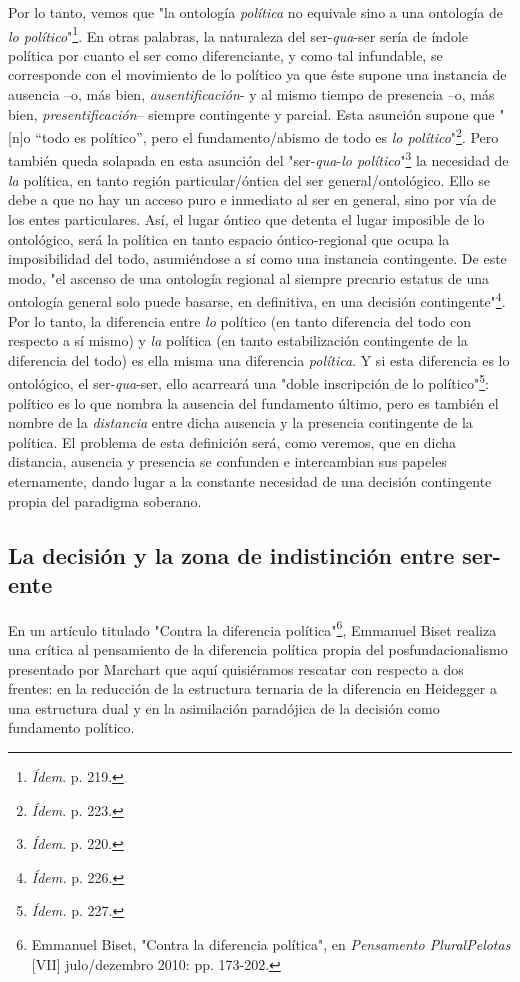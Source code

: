 \documentclass{book}
\begin{document}
Por lo tanto, vemos que "la ontología \emph{política} no equivale sino a
una ontología de \emph{lo político}"\footnote{\emph{Ídem}. p. 219.}. En
otras palabras, la naturaleza del ser-\emph{qua}-ser sería de índole
política por cuanto el ser como diferenciante, y como tal infundable, se
corresponde con el movimiento de lo político ya que éste supone una
instancia de ausencia --o, más bien, \emph{ausentificación}- y al mismo
tiempo de presencia --o, más bien, \emph{presentificación}-- siempre
contingente y parcial. Esta asunción supone que "{[}n{]}o ``todo es
político'', pero el fundamento/abismo de todo es \emph{lo
político}"\footnote{\emph{Ídem}. p. 223.}. Pero también queda solapada
en esta asunción del "ser-\emph{qua}-\emph{lo político}"\footnote{\emph{Ídem}.
  p. 220.} la necesidad de \emph{la} política, en tanto región
particular/óntica del ser general/ontológico. Ello se debe a que no hay
un acceso puro e inmediato al ser en general, sino por vía de los entes
particulares. Así, el lugar óntico que detenta el lugar imposible de lo
ontológico, será la política en tanto espacio óntico-regional que ocupa
la imposibilidad del todo, asumiéndose a sí como una instancia
contingente. De este modo, "el ascenso de una ontología regional al
siempre precario estatus de una ontología general solo puede basarse, en
definitiva, en una decisión contingente"\footnote{\emph{Ídem.} p. 226.}.
Por lo tanto, la diferencia entre \emph{lo} político (en tanto
diferencia del todo con respecto a sí mismo) y \emph{la} política (en
tanto estabilización contingente de la diferencia del todo) es ella
misma una diferencia \emph{política}. Y si esta diferencia es lo
ontológico, el ser-\emph{qua}-ser, ello acarreará una "doble inscripción
de lo político"\footnote{\emph{Ídem.} p. 227.}: político es lo que
nombra la ausencia del fundamento último, pero es también el nombre de
la \emph{distancia} entre dicha ausencia y la presencia contingente de
la política. El problema de esta definición será, como veremos, que en
dicha distancia, ausencia y presencia se confunden e intercambian sus
papeles eternamente, dando lugar a la constante necesidad de una
decisión contingente propia del paradigma soberano.

\subsection{La decisión y la zona de indistinción entre ser-ente}

En un artículo titulado "Contra la diferencia política"\footnote{Emmanuel
  Biset, "Contra la diferencia política", en \emph{Pensamento
  Plural\textbar Pelotas} {[}VII{]} julo/dezembro 2010: pp. 173-202.},
Emmanuel Biset realiza una crítica al pensamiento de la diferencia
política propia del posfundacionalismo presentado por Marchart que aquí
quisiéramos rescatar con respecto a dos frentes: en la reducción de la
estructura ternaria de la diferencia en Heidegger a una estructura dual
y en la asimilación paradójica de la decisión como fundamento político.
\end{document}
